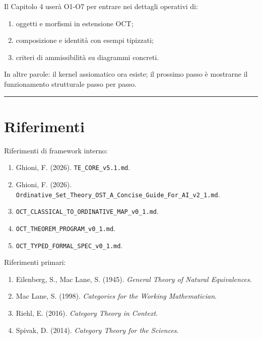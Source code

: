 Il Capitolo 4 userà O1-O7 per entrare nei dettagli operativi di:

\begin{enumerate}
\def\labelenumi{\arabic{enumi}.}
\tightlist
\item
  oggetti e morfismi in estensione OCT;
\item
  composizione e identità con esempi tipizzati;
\item
  criteri di ammissibilità su diagrammi concreti.
\end{enumerate}

In altre parole: il kernel assiomatico ora esiste; il prossimo passo è mostrarne il funzionamento strutturale passo per passo.

\begin{center}\rule{0.5\linewidth}{0.5pt}\end{center}

\section{Riferimenti}

Riferimenti di framework interno:

\begin{enumerate}
\def\labelenumi{\arabic{enumi}.}
\tightlist
\item
  Ghioni, F. (2026). \texttt{TE\_CORE\_v5.1.md}.
\item
  Ghioni, F. (2026). \texttt{Ordinative\_Set\_Theory\_OST\_A\_Concise\_Guide\_For\_AI\_v2\_1.md}.
\item
  \texttt{OCT\_CLASSICAL\_TO\_ORDINATIVE\_MAP\_v0\_1.md}.
\item
  \texttt{OCT\_THEOREM\_PROGRAM\_v0\_1.md}.
\item
  \texttt{OCT\_TYPED\_FORMAL\_SPEC\_v0\_1.md}.
\end{enumerate}

Riferimenti primari:

\begin{enumerate}
\def\labelenumi{\arabic{enumi}.}
\tightlist
\item
  Eilenberg, S., Mac Lane, S. (1945). \emph{General Theory of Natural Equivalences}.
\item
  Mac Lane, S. (1998). \emph{Categories for the Working Mathematician}.
\item
  Riehl, E. (2016). \emph{Category Theory in Context}.
\item
  Spivak, D. (2014). \emph{Category Theory for the Sciences}.
\end{enumerate}
